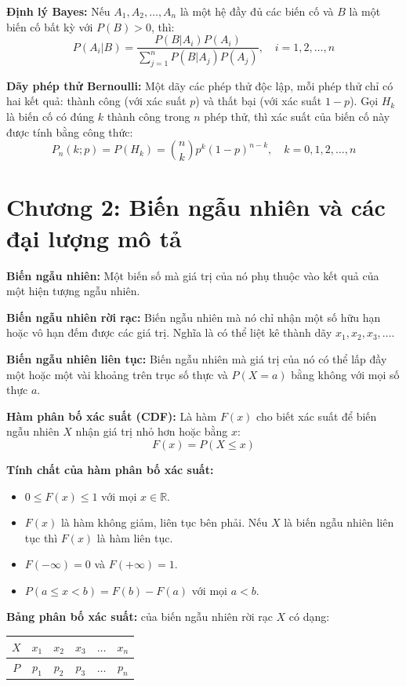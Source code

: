 \documentclass[12pt,a4paper]{article}
\begin{document}
\textbf{Định lý Bayes:} Nếu $A_1, A_2, \ldots, A_n$ là một hệ đầy đủ các biến cố và $B$ là một biến cố bất kỳ với $P(B) > 0$, thì:
\[P(A_i|B) = \frac{P(B|A_i)P(A_i)}{\sum_{j=1}^{n} P(B|A_j)P(A_j)}, \quad i = 1, 2, \ldots, n\]

\textbf{Dãy phép thử Bernoulli:} Một dãy các phép thử độc lập, mỗi phép thử chỉ có hai kết quả: thành công (với xác suất $p$) và thất bại (với xác suất $1-p$). Gọi $H_k$ là biến cố có đúng $k$ thành công trong $n$ phép thử, thì xác suất của biến cố này được tính bằng công thức:
\[P_n(k;p)=P(H_k) = \binom{n}{k} p^k (1-p)^{n-k}, \quad k = 0, 1, 2, \ldots, n\]

\newpage
\section*{Chương 2: Biến ngẫu nhiên và các đại lượng mô tả}
\textbf{Biến ngẫu nhiên:} Một biến số mà giá trị của nó phụ thuộc vào kết quả của một hiện tượng ngẫu nhiên.

\textbf{Biến ngẫu nhiên rời rạc:} Biến ngẫu nhiên mà nó chỉ nhận một số hữu hạn hoặc vô hạn đếm được các giá trị. Nghĩa là có thể liệt kê thành dãy $x_1, x_2, x_3, \ldots$.

\textbf{Biến ngẫu nhiên liên tục:} Biến ngẫu nhiên mà giá trị của nó có thể lấp đầy một hoặc một vài khoảng trên trục số thực và $P(X = a)$ bằng không với mọi số thực $a$.

\textbf{Hàm phân bố xác suất (CDF):} Là hàm $F(x)$ cho biết xác suất để biến ngẫu nhiên $X$ nhận giá trị nhỏ hơn hoặc bằng $x$:
\[F(x) = P(X \leq x)\]

\textbf{Tính chất của hàm phân bố xác suất:}
\begin{itemize}
    \item $0 \le F(x) \le 1$ với mọi $x \in \mathbb{R}$.
    \item $F(x)$ là hàm không giảm, liên tục bên phải. Nếu $X$ là biến ngẫu nhiên liên tục thì $F(x)$ là hàm liên tục.
    \item $F(-\infty) = 0$ và $F(+\infty) = 1$.
    \item $P(a \le x < b) = F(b) - F(a)$ với mọi $a < b$.
\end{itemize}

\textbf{Bảng phân bố xác suất:} của biến ngẫu nhiên rời rạc $X$ có dạng:
\begin{center}
\begin{tabular}{|c|c|c|c|c|c|}
\hline
$X$ & $x_1$ & $x_2$ & $x_3$ & $\ldots$ & $x_n$ \\
\hline
$P$ & $p_1$ & $p_2$ & $p_3$ & $\ldots$ & $p_n$ \\
\hline
\end{tabular}
\end{center}
\end{document}
